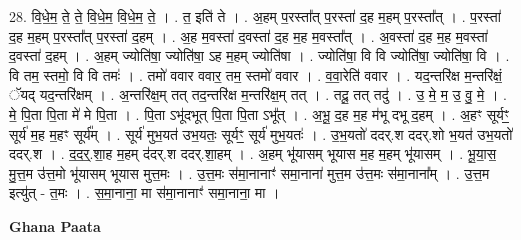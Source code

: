 \documentclass[17pt]{extarticle}
\begin{document}
28. वि॒धे॒म॒ ते॒ ते॒ वि॒धे॒म॒ वि॒धे॒म॒ ते॒ । . त॒ इति॑ ते । . अ॒हम् प॒रस्ता᳚त् प॒रस्ता॑ द॒ह म॒हम् प॒रस्ता᳚त् । . प॒रस्ता॑ द॒ह म॒हम् प॒रस्ता᳚त् प॒रस्ता॑ द॒हम् । . अ॒ह म॒वस्ता॑ द॒वस्ता॑ द॒ह म॒ह म॒वस्ता᳚त् । . अ॒वस्ता॑ द॒ह म॒ह म॒वस्ता॑ द॒वस्ता॑ द॒हम् । . अ॒हम् ज्योति॑षा॒ ज्योति॑षा॒ ऽह म॒हम् ज्योति॑षा । . ज्योति॑षा॒ वि वि ज्योति॑षा॒ ज्योति॑षा॒ वि । . वि तम॒ स्तमो॒ वि वि तमः॑ । . तमो॑ ववार ववार॒ तम॒ स्तमो॑ ववार । . व॒वा॒रेति॑ ववार । . यद॒न्तरि॑क्ष म॒न्तरि॑क्षं॒ ॅयद् यद॒न्तरि॑क्षम् । . अ॒न्तरि॑क्ष॒म् तत् तद॒न्तरि॑क्ष म॒न्तरि॑क्ष॒म् तत् । . तदू॒ तत् तदु॑ । . उ॒ मे॒ म॒ उ॒ वु॒ मे॒ । . मे॒ पि॒ता पि॒ता मे॑ मे पि॒ता । . पि॒ता ऽभू॑दभूत् पि॒ता पि॒ता ऽभू᳚त् । . अ॒भू॒ द॒ह म॒ह म॑भू दभू द॒हम् । . अ॒हꣳ सूर्यꣳ॒॒ सूर्य॑ म॒ह म॒हꣳ सूर्य᳚म् । . सूर्य॑ मुभ॒यत॑ उभ॒यतः॒ सूर्यꣳ॒॒ सूर्य॑ मुभ॒यतः॑ । . उ॒भ॒यतो॑ ददर्.श ददर्.शो भ॒यत॑ उभ॒यतो॑ ददर्.श । . द॒द॒र्॒.शा॒ह म॒हम् द॑दर्.श ददर्.शा॒हम् । . अ॒हम् भू॑यासम् भूयास म॒ह म॒हम् भू॑यासम् । . भू॒या॒स॒ मु॒त्त॒म उ॑त्त॒मो भू॑यासम् भूयास मुत्त॒मः । . उ॒त्त॒मः स॑मा॒नानाꣳ॑ समा॒नाना॑ मुत्त॒म उ॑त्त॒मः स॑मा॒नाना᳚म् । . उ॒त्त॒म इत्यु॑त् - त॒मः । . स॒मा॒नाना॒ मा स॑मा॒नानाꣳ॑ समा॒नाना॒ मा । \newline

\textbf{Ghana Paata } \newline
\end{document}
